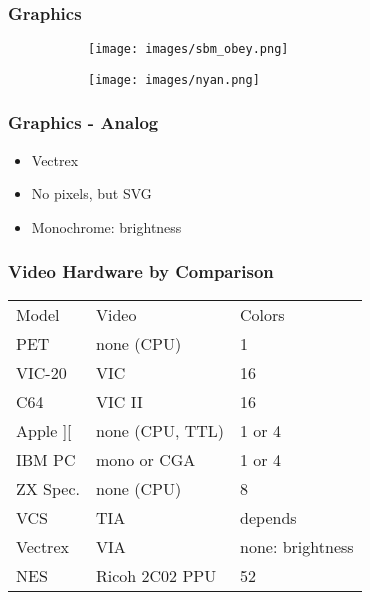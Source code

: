\begin{frame}
\frametitle[fragile]{Graphics}

\begin{figure}
	\begin{subfigure}[b]{0.4\textwidth}
		\texttt{[image: images/sbm\_obey.png]}
	\end{subfigure}
	\begin{subfigure}[b]{0.5\textwidth}
		\texttt{[image: images/nyan.png]}
	\end{subfigure}
\end{figure}

\end{frame}


\begin{frame}
\frametitle{Graphics - Analog}

\begin{itemize}
\item Vectrex
\item No pixels, but SVG
\item Monochrome: brightness
\end{itemize}

\end{frame}


\begin{frame}
\frametitle{Video Hardware by Comparison}

\begin{tabular}{|l|l|l|}
\hline Model & Video & Colors \\
PET & none (CPU) & 1 \\
VIC-20 & VIC & 16 \\
C64 & VIC II & 16 \\
Apple ][ & none (CPU, TTL) & 1 or 4 \\
IBM PC & mono or CGA & 1 or 4 \\
ZX Spec. & none (CPU) & 8 \\ \hline
VCS & TIA & depends \\
Vectrex & VIA & none: brightness \\
NES & Ricoh 2C02 PPU & 52 \\ \hline
\end{tabular}

\end{frame}


